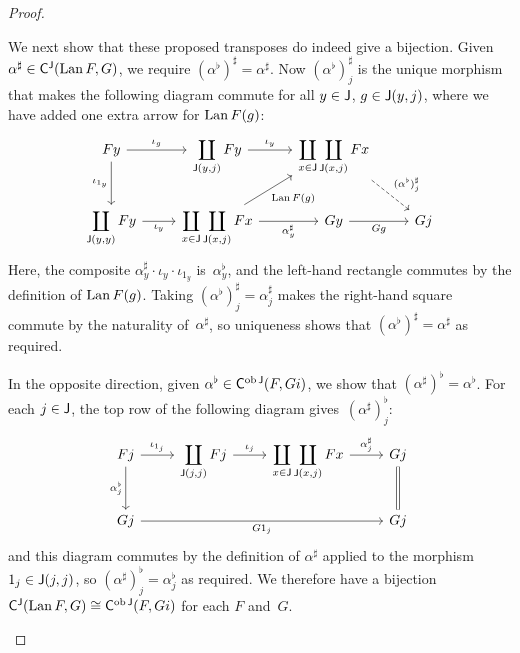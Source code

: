 \documentclass[../../solutions]{subfiles}
\begin{document}
\begin{proof}
\begin{enumerate}[label=(\roman*)]
    We next show that these proposed transposes do indeed give a
    bijection.  Given $\alpha^\sharp\in{\mathsf{C}}^{\mathsf{J}}(\operatorname{Lan} F,G)$, we require
    $(\alpha^\flat)^\sharp=\alpha^\sharp$.  Now
    $(\alpha^\flat)^\sharp_j$ is the unique morphism that makes the
    following diagram commute for all $y\in{\mathsf{J}}$, $g\in{\mathsf{J}}(y,j)$, where
    we have added one extra arrow for $\operatorname{Lan} F(g)$:
    $$
    \begin{tikzcd}
      Fy \ar[r, "\iota_g"] \ar[d, "\iota_{1_y}"']
      & \displaystyle \coprod_{\sJ(y,j)} Fy \ar[r, "\iota_y"]
      & \displaystyle \coprod_{x\in\sJ\vphantom{j}}\coprod_{\sJ(x,j)} Fx
      \ar[dr, dashed, "(\alpha^\flat)^\sharp_j"]
      \\
      \displaystyle \coprod_{\sJ(y,y)} Fy \ar[r, "\iota_y"']
      & \displaystyle \coprod_{x\in\sJ\vphantom{j}}\coprod_{\sJ(x,j)} Fx
      \ar[ur, "\Lan F(g)"']
      \ar[r, "\alpha^\sharp_y"']
      & Gy \ar[r, "Gg"']
      & Gj
    \end{tikzcd}
    $$
    Here, the composite
    $\alpha^\sharp_y\cdot \iota_y\cdot \iota_{1_y}$
    is~$\alpha^\flat_y$, and the left-hand rectangle commutes by the
    definition of $\operatorname{Lan} F(g)$.  Taking
    $(\alpha^\flat)^\sharp_j=\alpha^\sharp_j$ makes the right-hand
    square commute by the naturality of~$\alpha^\sharp$, so uniqueness
    shows that $(\alpha^\flat)^\sharp=\alpha^\sharp$ as required.

    In the opposite direction, given
    $\alpha^\flat\in{\mathsf{C}}^{\operatorname{ob}{\mathsf{J}}}(F,Gi)$, we show that
    $(\alpha^\sharp)^\flat=\alpha^\flat$.  For each $j\in{\mathsf{J}}$, the top
    row of the following diagram gives~$(\alpha^\sharp)^\flat_j$:
    $$
    \begin{tikzcd}
      Fj \ar[r, "\iota_{1_j}"] \ar[d, "\alpha^\flat_j"']
      & \displaystyle \coprod_{\sJ(j,j)} Fj \ar[r, "\iota_j"]
      & \displaystyle \coprod_{x\in\sJ\vphantom{j}}\coprod_{\sJ(x,j)} Fx
      \ar[r, "\alpha^\sharp_j"]
      & Gj \ar[d, equal]
      \\
      Gj \ar[rrr, "G1_j"']
      &&& Gj
    \end{tikzcd}
    $$
    and this diagram commutes by the definition of $\alpha^\sharp$
    applied to the morphism $1_j\in{\mathsf{J}}(j,j)$, so
    $(\alpha^\sharp)^\flat_j=\alpha^\flat_j$ as required.  We
    therefore have a bijection ${\mathsf{C}}^{\mathsf{J}}(\operatorname{Lan} F,G) \cong
    {\mathsf{C}}^{\operatorname{ob}{\mathsf{J}}}(F,Gi)$ for each $F$ and~$G$.


\end{enumerate}
\end{proof}
\end{document}
